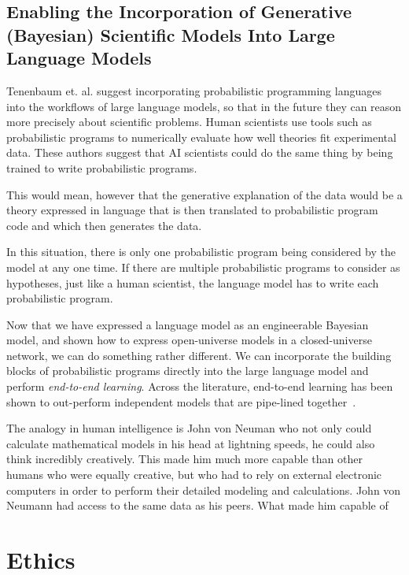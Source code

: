 \subsection{Enabling the Incorporation of Generative (Bayesian) Scientific Models Into Large Language Models}

Tenenbaum et. al. suggest incorporating probabilistic programming languages into the workflows of large language models, so that in the future they can reason more precisely about scientific problems.  Human scientists use tools such as probabilistic programs to numerically evaluate how well theories fit experimental data.  These authors suggest that AI scientists could do the same thing by being trained to write probabilistic programs.

This would mean, however that the generative explanation of the data would be a theory expressed in language that is then translated to probabilistic program code and which then generates the data.

In this situation, there is only one probabilistic program being considered by the model at any one time.  If there are multiple probabilistic programs to consider as hypotheses, just like a human scientist, the language model has to write each probabilistic program.

Now that we have expressed a language model as an engineerable Bayesian model, and shown how to express open-universe models in a closed-universe network, we can do something rather different.  We can incorporate the building blocks of probabilistic programs directly into the large language model and perform \emph{end-to-end learning}.  Across the literature, end-to-end learning has been shown to out-perform independent models that are pipe-lined together~\cite{end to end learning outperforms pipelined models}. 

The analogy in human intelligence is John von Neuman who not only could calculate mathematical models in his head at lightning speeds, he could also think incredibly creatively.  This made him much more capable than other humans who were equally creative, but who had to rely on external electronic computers in order to perform their detailed modeling and calculations.\cite{} John von Neumann had access to the same data as his peers.  What made him capable of 

\section{Ethics}


